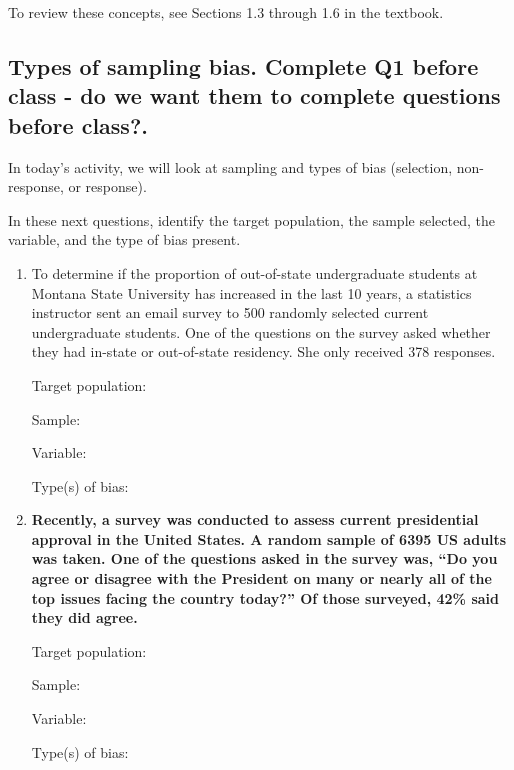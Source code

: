 \documentclass[
]{report}
\begin{document}
To review these concepts, see Sections 1.3 through 1.6 in the textbook.

\newpage

\hypertarget{types-of-sampling-bias.-complete-q1-before-class---do-we-want-them-to-complete-questions-before-class.}{%
\subsection{\texorpdfstring{Types of sampling bias. \textbf{Complete Q1 before class - do we want them to complete questions before class?}.}{Types of sampling bias. Complete Q1 before class - do we want them to complete questions before class?.}}\label{types-of-sampling-bias.-complete-q1-before-class---do-we-want-them-to-complete-questions-before-class.}}

In today's activity, we will look at sampling and types of bias (selection, non-response, or response).

In these next questions, identify the target population, the sample selected, the variable, and the type of bias present.

\begin{enumerate}
\def\labelenumi{\arabic{enumi}.}
\item
  To determine if the proportion of out-of-state undergraduate students at Montana State University has increased in the last 10 years, a statistics instructor sent an email survey to 500 randomly selected current undergraduate students. One of the questions on the survey asked whether they had in-state or out-of-state residency. She only received 378 responses.
  \vspace{0.25in}

  Target population:
  \vspace{0.3in}

  Sample:
  \vspace{0.3in}

  Variable:
  \vspace{0.3in}

  Type(s) of bias:
  \vspace{0.3in}
\item
  \textbf{Recently, a survey was conducted to assess current presidential approval in the United States. A random sample of 6395 US adults was taken. One of the questions asked in the survey was, ``Do you agree or disagree with the President on many or nearly all of the top issues facing the country today?'' Of those surveyed, 42\% said they did agree.}
  \vspace{0.25in}

  Target population:
  \vspace{0.3in}

  Sample:
  \vspace{0.3in}

  Variable:
  \vspace{0.3in}

  Type(s) of bias:
  \vspace{0.3in}
\end{enumerate}
\end{document}
